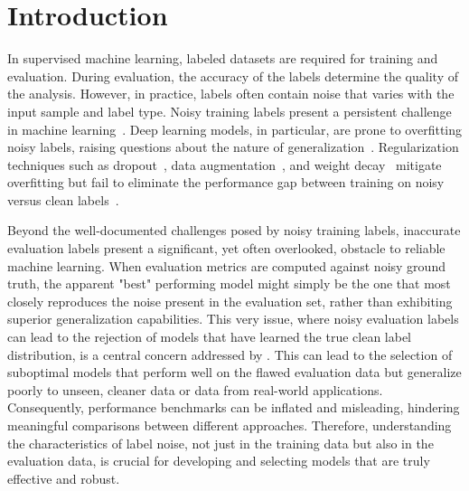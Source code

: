 \section{Introduction}
In supervised machine learning, labeled datasets are required for training and evaluation. During evaluation, the accuracy of the labels determine the quality of the analysis. However, in practice, labels often contain noise that varies with the input sample and label type. Noisy training labels present a persistent challenge in machine learning~\citep{Liang2009, Song2022}. Deep learning models, in particular, are prone to overfitting noisy labels, raising questions about the nature of generalization~\citep{Zhang2021}. Regularization techniques such as dropout~\citep{Srivastava2014}, data augmentation~\citep{Shorten2019}, and weight decay~\citep{Krogh1991} mitigate overfitting but fail to eliminate the performance gap between training on noisy versus clean labels~\citep{Song2022}. 

Beyond the well-documented challenges posed by noisy training labels, inaccurate evaluation labels present a significant, yet often overlooked, obstacle to reliable machine learning. When evaluation metrics are computed against noisy ground truth, the apparent "best" performing model might simply be the one that most closely reproduces the noise present in the evaluation set, rather than exhibiting superior generalization capabilities. This very issue, where noisy evaluation labels can lead to the rejection of models that have learned the true clean label distribution, is a central concern addressed by \citet{Görnitz2014}. This can lead to the selection of suboptimal models that perform well on the flawed evaluation data but generalize poorly to unseen, cleaner data or data from real-world applications. Consequently, performance benchmarks can be inflated and misleading, hindering meaningful comparisons between different approaches. Therefore, understanding the characteristics of label noise, not just in the training data but also in the evaluation data, is crucial for developing and selecting models that are truly effective and robust.

